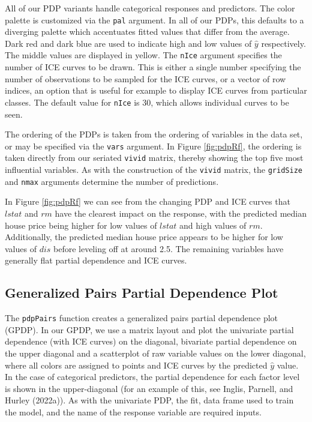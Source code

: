 All of our PDP variants handle categorical responses and predictors. The color palette is customized via the \texttt{pal} argument. In all of our PDPs, this defaults to a diverging palette which accentuates fitted values that differ from the average. Dark red and dark blue are used to indicate high and low values of \(\hat{y}\) respectively. The middle values are displayed in yellow. The \texttt{nIce} argument specifies the number of ICE curves to be drawn. This is either a single number specifying the number of observations to be sampled for the ICE curves, or a vector of row indices, an option that is useful for example to display ICE curves from particular classes. The default value for \texttt{nIce} is 30, which allows individual curves to be seen.

The ordering of the PDPs is taken from the ordering of variables in the data set, or may be specified via the \texttt{vars} argument. In Figure \ref{fig:pdpRf}, the ordering is taken directly from our seriated \texttt{vivid} matrix, thereby showing the top five most influential variables. As with the construction of the \texttt{vivid} matrix, the \texttt{gridSize} and \texttt{nmax} arguments determine the number of predictions.

In Figure \ref{fig:pdpRf} we can see from the changing PDP and ICE curves that \(lstat\) and \(rm\) have the clearest impact on the response, with the predicted median house price being higher for low values of \(lstat\) and high values of \(rm\). Additionally, the predicted median house price appears to be higher for low values of \(dis\) before leveling off at around 2.5. The remaining variables have generally flat partial dependence and ICE curves.

\hypertarget{generalized-pairs-partial-dependence-plot}{%
\subsection{Generalized Pairs Partial Dependence Plot}\label{generalized-pairs-partial-dependence-plot}}

The \texttt{pdpPairs} function creates a generalized pairs partial dependence plot (GPDP). In our GPDP, we use a matrix layout and plot the univariate partial dependence (with ICE curves) on the diagonal, bivariate partial dependence on the upper diagonal and a scatterplot of raw variable values on the lower diagonal, where all colors are assigned to points and ICE curves by the predicted \(\hat{y}\) value. In the case of categorical predictors, the partial dependence for each factor level is shown in the upper-diagonal (for an example of this, see Inglis, Parnell, and Hurley (2022a)). As with the univariate PDP, the fit, data frame used to train the model, and the name of the response variable are required inputs.

